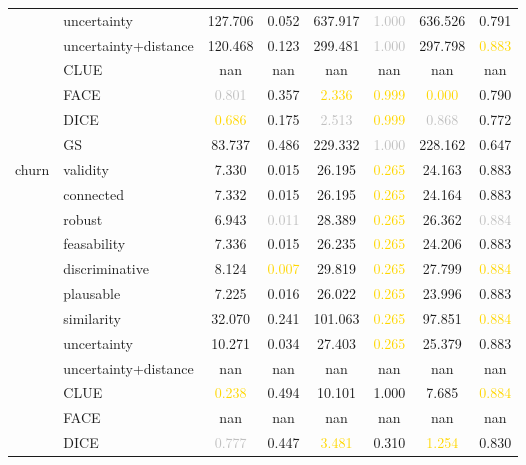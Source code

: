 \begin{table}[ht]
\begin{tabular}{l l c c c c c c}
 & uncertainty & 127.706 & \textcolor{bronze}{0.052} & 637.917 & \textcolor{silver}{1.000} & 636.526 & 0.791 \\
 & uncertainty+distance & 120.468 & 0.123 & 299.481 & \textcolor{silver}{1.000} & 297.798 & \textcolor{gold}{0.883} \\
 & CLUE & nan & nan & nan & nan & nan & nan \\
 & FACE & \textcolor{silver}{0.801} & 0.357 & \textcolor{gold}{2.336} & \textcolor{gold}{0.999} & \textcolor{gold}{0.000} & 0.790 \\
 & DICE & \textcolor{gold}{0.686} & 0.175 & \textcolor{silver}{2.513} & \textcolor{gold}{0.999} & \textcolor{silver}{0.868} & 0.772 \\
 & GS & \textcolor{bronze}{83.737} & 0.486 & \textcolor{bronze}{229.332} & \textcolor{silver}{1.000} & \textcolor{bronze}{228.162} & 0.647 \\
\hline
\multirow{13}{*}{churn} & validity & 7.330 & 0.015 & 26.195 & \textcolor{gold}{0.265} & 24.163 & 0.883 \\
 & connected & 7.332 & 0.015 & 26.195 & \textcolor{gold}{0.265} & 24.164 & 0.883 \\
 & robust & 6.943 & \textcolor{silver}{0.011} & 28.389 & \textcolor{gold}{0.265} & 26.362 & \textcolor{silver}{0.884} \\
 & feasability & 7.336 & \textcolor{bronze}{0.015} & 26.235 & \textcolor{gold}{0.265} & 24.206 & 0.883 \\
 & discriminative & 8.124 & \textcolor{gold}{0.007} & 29.819 & \textcolor{gold}{0.265} & 27.799 & \textcolor{gold}{0.884} \\
 & plausable & 7.225 & 0.016 & 26.022 & \textcolor{gold}{0.265} & 23.996 & 0.883 \\
 & similarity & 32.070 & 0.241 & 101.063 & \textcolor{gold}{0.265} & 97.851 & \textcolor{gold}{0.884} \\
 & uncertainty & 10.271 & 0.034 & 27.403 & \textcolor{gold}{0.265} & 25.379 & \textcolor{bronze}{0.883} \\
 & uncertainty+distance & nan & nan & nan & nan & nan & nan \\
 & CLUE & \textcolor{gold}{0.238} & 0.494 & \textcolor{bronze}{10.101} & 1.000 & \textcolor{bronze}{7.685} & \textcolor{gold}{0.884} \\
 & FACE & nan & nan & nan & nan & nan & nan \\
 & DICE & \textcolor{silver}{0.777} & 0.447 & \textcolor{gold}{3.481} & \textcolor{bronze}{0.310} & \textcolor{gold}{1.254} & 0.830 \\

\end{tabular}
\end{table}
